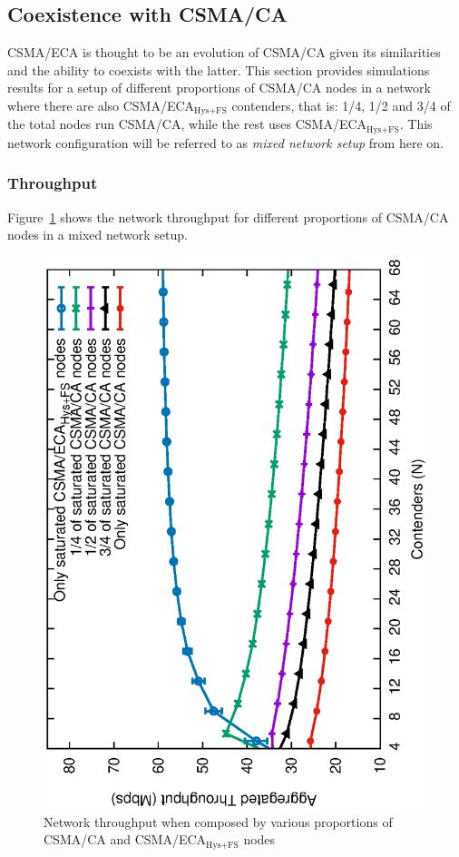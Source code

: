 	\subsection{Coexistence with CSMA/CA}\label{coexistance-w-csmaca}
	
	CSMA/ECA is thought to be an evolution of CSMA/CA given its similarities and the ability to coexists with the latter. This section provides simulations results for a setup of different proportions of CSMA/CA nodes in a network where there are also CSMA/ECA$_{\text{Hys+FS}}$ contenders, that is: 1/4, 1/2 and 3/4 of the total nodes run CSMA/CA, while the rest uses CSMA/ECA$_{\text{Hys+FS}}$. This network configuration will be referred to as \emph{mixed network setup} from here on.	
	\subsubsection{Throughput}
	
	Figure~\ref{fig:mixedThroughput-sat} shows the network throughput for different proportions of CSMA/CA nodes in a mixed network setup.
	
	\begin{figure}[tb]
		\centering
		\includegraphics[width=0.7\linewidth,angle=-90]{figures/saturated/mixed/throughput-mixed/throughput-saturated-mixed-TON.eps}
		\caption{Network throughput when composed by various proportions of CSMA/CA and CSMA/ECA$_{\text{Hys+FS}}$ nodes}
		\label{fig:mixedThroughput-sat}
	\end{figure}
	
